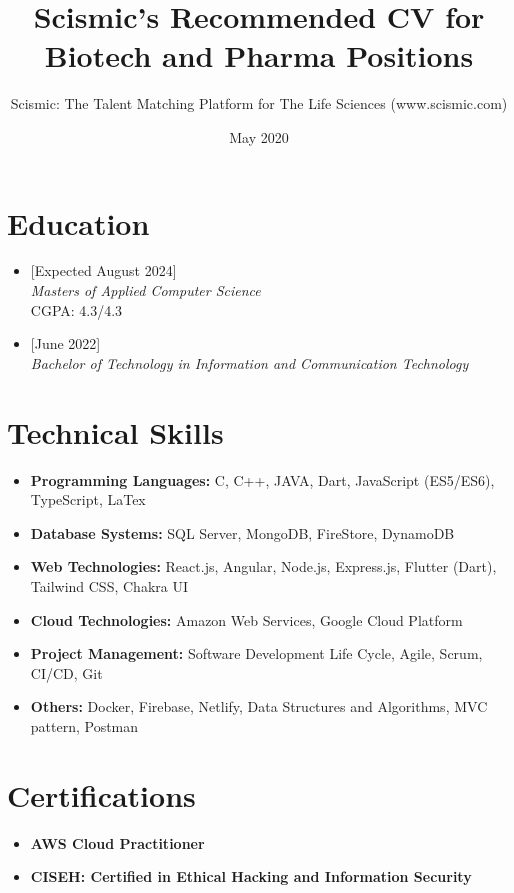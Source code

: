 \documentclass{article}
\title{Scismic's Recommended CV for Biotech and Pharma Positions}
\author{Scismic: The Talent Matching Platform for The Life Sciences (www.scismic.com)}
\date{May 2020}
\begin{document}

\makecvtitle %

\section{Education}
\begin{itemize}

\item
{}[Expected August 2024]
\\\textit{Masters of Applied Computer Science}
\\
CGPA: 4.3/4.3
\item
{}[June 2022]
\\\textit{Bachelor of Technology in Information and Communication Technology}


\end{itemize}
 
\section{Technical Skills}

\begin{itemize}
\item \textbf{Programming Languages:} C, C++, JAVA, Dart, JavaScript (ES5/ES6), TypeScript, LaTex
\item \textbf{Database Systems:} SQL Server, MongoDB, FireStore, DynamoDB
\item \textbf{Web Technologies:} React.js, Angular, Node.js, Express.js, Flutter (Dart), Tailwind CSS, Chakra UI
\item \textbf{Cloud Technologies:} Amazon Web Services, Google Cloud Platform
\item \textbf{Project Management:} Software Development Life Cycle, Agile, Scrum, CI/CD, Git  
\item \textbf{Others:} Docker, Firebase, Netlify, Data Structures and Algorithms, MVC pattern, Postman

\end{itemize}

\section{Certifications}
\begin{itemize}
\item \textbf{AWS Cloud Practitioner}
\item \textbf{CISEH: Certified in Ethical Hacking and Information Security}
\end{itemize}
\end{document}
